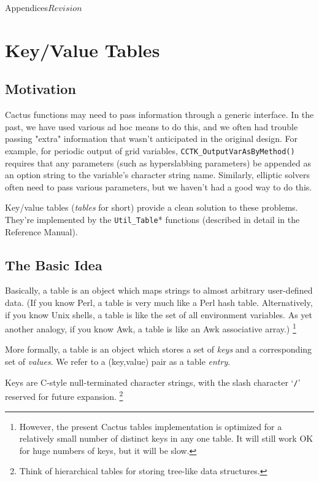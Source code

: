 \begin{cactuspart}{Appendices}{}{$Revision$}
\section{Key/Value Tables}


\subsection{Motivation}

Cactus functions may need to pass information through a generic
interface.  In the past, we have used various ad hoc means to do this,
and we often had trouble passing "extra" information that wasn't
anticipated in the original design.  For example, for periodic output
of grid variables,
\verb|CCTK_OutputVarAsByMethod()| requires that
any parameters (such as hyperslabbing parameters) be appended as an option
string to the variable's character string name.  Similarly, elliptic
solvers often need to pass various parameters, but we haven't had a
good way to do this.

Key/value tables (\textit{tables} for short) provide a clean solution
to these problems.  They're implemented by the \verb|Util_Table|*
functions (described in detail in the Reference Manual).


\subsection{The Basic Idea}

Basically, a table is an object which maps strings to almost arbitrary
user-defined data.  (If you know Perl, a table is very much like a
Perl hash table.  Alternatively, if you know Unix shells, a table is
like the set of all environment variables.  As yet another analogy,
if you know Awk, a table is like an Awk associative array.)%
\footnote{%
	 However, the present Cactus tables implementation
	 is optimized for a relatively small number of
	 distinct keys in any one table.  It will still
	 work OK for huge numbers of keys, but it will be
	 slow.
	 }%

More formally, a table is an object which stores a set of \textit{keys}
and a corresponding set of \textit{values}.  We refer to a (key,value)
pair as a table \textit{entry}.

Keys are C-style null-terminated character strings, with the slash
character `{\tt /}' reserved for future expansion.%
\footnote{%
	 Think of hierarchical tables for storing
	 tree-like data structures.%
	 }%


\end{cactuspart}

